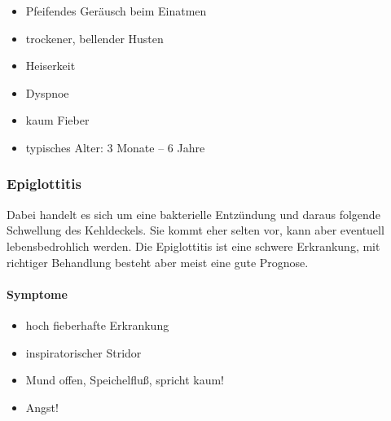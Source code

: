 \begin{itemize}
    \item Pfeifendes Geräusch beim Einatmen
    \gZ{[inspiratorischer Stridor)}
    \item trockener, bellender Husten
    \item Heiserkeit
    \item Dyspnoe
    \item kaum Fieber
    \item typisches Alter: 3 Monate -- 6 Jahre
\end{itemize}


\subsubsection{Epiglottitis}

Dabei handelt es sich um eine bakterielle Entzündung und daraus  folgende Schwellung des
Kehldeckels. Sie kommt eher selten vor, kann aber eventuell lebensbedrohlich werden. Die Epiglottitis ist eine schwere Erkrankung, mit richtiger  Behandlung besteht aber meist eine gute Prognose.

\paragraph{Symptome}

\begin{itemize}
    \item hoch fieberhafte Erkrankung
    \item inspiratorischer Stridor
    \item Mund offen, Speichelfluß, spricht kaum!
    \item Angst!
\end{itemize}


